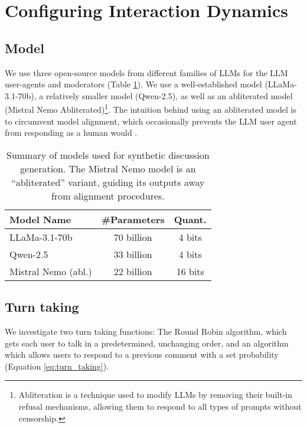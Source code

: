 \section{Configuring Interaction Dynamics}

\subsection{Model}

We use three open-source models from different families of \acp{LLM} for the \ac{LLM} user-agents and moderators (Table \ref{tab:models}). We use a well-established model (LLaMa-3.1-70b), a relatively smaller model (Qwen-2.5), as well as an abliterated model (Mistral Nemo Abliterated)\footnote{Abliteration is a technique used to modify \acp{LLM} by removing their built-in refusal mechanisms, allowing them to respond to all types of prompts without censorship.}. The intuition behind using an abliterated model is to circumvent model alignment, which occasionally prevents the \ac{LLM} user agent from responding as a human would \cite{Park2023GenerativeAI}. %

\begin{table}[ht]
\centering
    \begin{tabular}{|l|c|c|}
        \hline
        \textbf{Model Name} & \textbf{\#Parameters} & \textbf{Quant.} \\
        \hline
        LLaMa-3.1-70b & 70 billion & 4 bits \\
        Qwen-2.5 & 33 billion & 4 bits \\
        Mistral Nemo (abl.) & 22 billion & 16 bits\\
        \hline
    \end{tabular}
\caption{Summary of models used for synthetic discussion generation. The Mistral Nemo model is an “abliterated” variant, guiding its outputs away from alignment procedures.}
\label{tab:models}
\end{table}

\subsection{Turn taking}
We investigate two turn taking functions: The Round Robin algorithm, which gets each user to talk in a predetermined, unchanging order, and an algorithm which allows users to respond to a previous comment with a set probability (Equation \ref{eq:turn_taking}).

